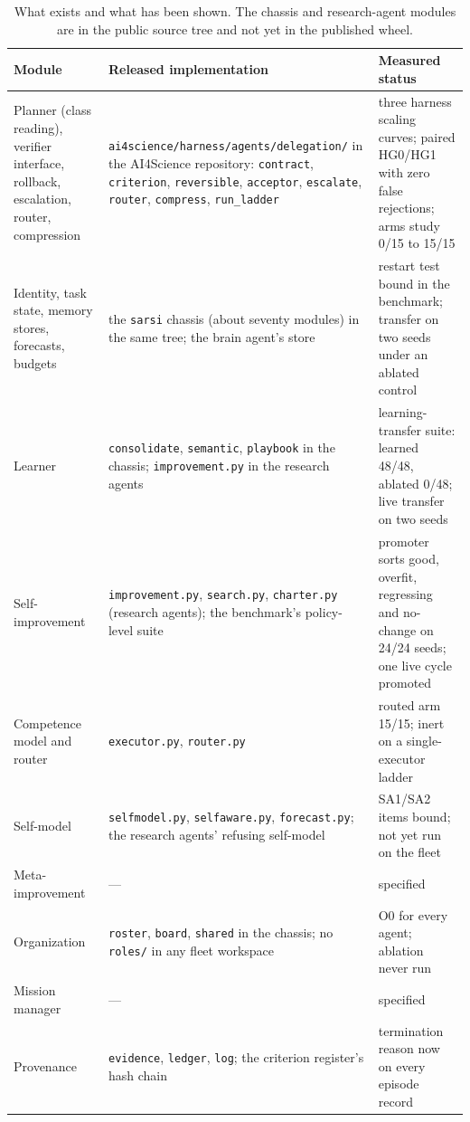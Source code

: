 \begin{table}[!htbp]
\centering\footnotesize
\begin{tabularx}{\textwidth}{@{}lYY@{}}
\toprule
Module & Released implementation & Measured status \\
\midrule
Planner (class reading), verifier interface, rollback, escalation, router, compression & \texttt{ai4science/}\allowbreak\texttt{harness/}\allowbreak\texttt{agents/}\allowbreak\texttt{delegation/} in the AI4Science repository: \texttt{contract}, \texttt{criterion}, \texttt{reversible}, \texttt{acceptor}, \texttt{escalate}, \texttt{router}, \texttt{compress}, \texttt{run\_ladder} & three harness scaling curves; paired HG0/HG1 with zero false rejections; arms study 0/15 to 15/15 \\
Identity, task state, memory stores, forecasts, budgets & the \texttt{sarsi} chassis (about seventy modules) in the same tree; the brain agent's store & restart test bound in the benchmark; transfer on two seeds under an ablated control \\
Learner & \texttt{consolidate}, \texttt{semantic}, \texttt{playbook} in the chassis; \texttt{improvement.py} in the research agents & learning-transfer suite: learned 48/48, ablated 0/48; live transfer on two seeds \\
Self-improvement & \texttt{improvement.py}, \texttt{search.py}, \texttt{charter.py} (research agents); the benchmark's policy-level suite & promoter sorts good, overfit, regressing and no-change on 24/24 seeds; one live cycle promoted \\
Competence model and router & \texttt{executor.py}, \texttt{router.py} & routed arm 15/15; inert on a single-executor ladder \\
Self-model & \texttt{selfmodel.py}, \texttt{selfaware.py}, \texttt{forecast.py}; the research agents' refusing self-model & SA1/SA2 items bound; not yet run on the fleet \\
Meta-improvement & --- & specified \\
Organization & \texttt{roster}, \texttt{board}, \texttt{shared} in the chassis; no \texttt{roles/} in any fleet workspace & O0 for every agent; ablation never run \\
Mission manager & --- & specified \\
Provenance & \texttt{evidence}, \texttt{ledger}, \texttt{log}; the criterion register's hash chain & termination reason now on every episode record \\
\bottomrule
\end{tabularx}
\caption{What exists and what has been shown. The chassis and research-agent modules are in the public source tree and not yet in the published wheel.}
\label{tab:status}
\end{table}

